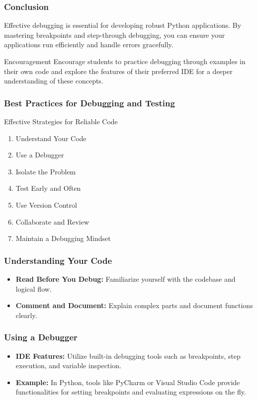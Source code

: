 \documentclass{beamer}
\begin{document}
\begin{frame}[fragile]
    \frametitle{Conclusion}
    Effective debugging is essential for developing robust Python applications. 
    By mastering breakpoints and step-through debugging, you can ensure your applications run efficiently and handle errors gracefully. 

    \begin{block}{Encouragement}
        Encourage students to practice debugging through examples in their own code and explore the features of 
        their preferred IDE for a deeper understanding of these concepts.
    \end{block}
\end{frame}

\begin{frame}
    \frametitle{Best Practices for Debugging and Testing}
    \begin{block}{Effective Strategies for Reliable Code}
        \begin{enumerate}
            \item Understand Your Code
            \item Use a Debugger
            \item Isolate the Problem
            \item Test Early and Often
            \item Use Version Control
            \item Collaborate and Review
            \item Maintain a Debugging Mindset
        \end{enumerate}
    \end{block}
\end{frame}

\begin{frame}[fragile]
    \frametitle{Understanding Your Code}
    \begin{itemize}
        \item \textbf{Read Before You Debug:} Familiarize yourself with the codebase and logical flow.
        \item \textbf{Comment and Document:} Explain complex parts and document functions clearly.
    \end{itemize}
\end{frame}

\begin{frame}[fragile]
    \frametitle{Using a Debugger}
    \begin{itemize}
        \item \textbf{IDE Features:} Utilize built-in debugging tools such as breakpoints, step execution, and variable inspection.
        \item \textbf{Example:} In Python, tools like PyCharm or Visual Studio Code provide functionalities for setting breakpoints and evaluating expressions on the fly.
    \end{itemize}
\end{frame}
\end{document}
